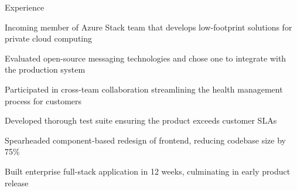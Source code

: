 \documentclass{resume} %
\begin{document}
    \begin{rSection}{Experience}

        \company{\microsoft}{\seattle}
                \begin{rList}
                    \item Incoming member of Azure Stack team that develops low-footprint
                        solutions for private cloud computing
                \end{rList}
                \begin{rList}
                    \item Evaluated open-source messaging technologies
                        and chose one to integrate with the production system
                    \item Participated in cross-team collaboration streamlining
                        the health management process for customers
                    \item Developed thorough test suite ensuring the product exceeds
                        customer SLAs
                \end{rList}
        \vspace{0.5em}


        \company{\lefttravel}{\la}
                \begin{rList}
                    \item Spearheaded component-based redesign of frontend,
                        reducing codebase size by 75\%
                    \item Built enterprise full-stack application in 12 weeks, culminating in early
                        product release
                \end{rList}
        \vspace{0.5em}

    \end{rSection}

\end{document}
